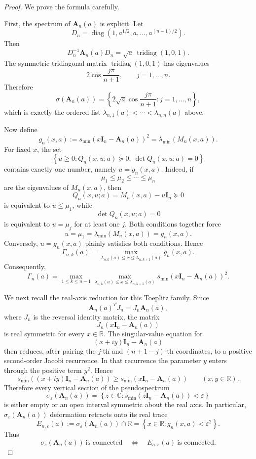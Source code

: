 \documentclass[11pt]{article}
\DeclareMathOperator{\tridiag}{tridiag}
\DeclareMathOperator{\diag}{diag}
\newcommand{\A}{\mathbf A}
\newcommand{\I}{\mathbf I}
\newcommand{\R}{\mathbb R}
\newcommand{\C}{\mathbb C}
\newcommand{\eps}{\varepsilon}
\begin{document}
\begin{proof}
We prove the formula carefully.

First, the spectrum of \(\A_n(a)\) is explicit. Let
\[
D_n=\diag(1,a^{1/2},a,\dots,a^{(n-1)/2}).
\]
Then
\[
D_n^{-1}\A_n(a)D_n
=
\sqrt a\,\tridiag(1,0,1).
\]
The symmetric tridiagonal matrix \(\tridiag(1,0,1)\) has eigenvalues
\[
2\cos\frac{j\pi}{n+1},
\qquad j=1,\dots,n.
\]
Therefore
\[
\sigma(\A_n(a))
=
\left\{
2\sqrt a\cos\frac{j\pi}{n+1}:j=1,\dots,n
\right\},
\]
which is exactly the ordered list \(\lambda_{n,1}(a)<\cdots<\lambda_{n,n}(a)\) above.

Now define
\[
g_n(x,a):=
s_{\min}\!\left(x\I_n-\A_n(a)\right)^2
=
\lambda_{\min}\!\left(M_n(x,a)\right).
\]
For fixed \(x\), the set
\[
\left\{
u\ge0:Q_n(x,u;a)\succeq0,\ \det Q_n(x,u;a)=0
\right\}
\]
contains exactly one number, namely \(u=g_n(x,a)\). Indeed, if
\[
\mu_1\le\mu_2\le\cdots\le\mu_n
\]
are the eigenvalues of \(M_n(x,a)\), then
\[
Q_n(x,u;a)=M_n(x,a)-u\I_n\succeq0
\]
is equivalent to \(u\le\mu_1\), while
\[
\det Q_n(x,u;a)=0
\]
is equivalent to \(u=\mu_j\) for at least one \(j\). Both conditions together force
\[
u=\mu_1=\lambda_{\min}(M_n(x,a))=g_n(x,a).
\]
Conversely, \(u=g_n(x,a)\) plainly satisfies both conditions. Hence
\[
\Gamma_{n,k}(a)
=
\max_{\lambda_{n,k}(a)\le x\le\lambda_{n,k+1}(a)}
g_n(x,a).
\]
Consequently,
\[
\Gamma_n(a)
=
\max_{1\le k\le n-1}
\max_{\lambda_{n,k}(a)\le x\le\lambda_{n,k+1}(a)}
s_{\min}\!\left(x\I_n-\A_n(a)\right)^2.
\]

We next recall the real-axis reduction for this Toeplitz family. Since
\[
\A_n(a)^TJ_n=J_n\A_n(a),
\]
where \(J_n\) is the reversal identity matrix, the matrix
\[
J_n(x\I_n-\A_n(a))
\]
is real symmetric for every \(x\in\R\). The singular-value equation for
\[
(x+iy)\I_n-\A_n(a)
\]
then reduces, after pairing the \(j\)-th and \((n+1-j)\)-th coordinates, to a positive second-order Jacobi recurrence. In that recurrence the parameter \(y\) enters through the positive term \(y^2\). Hence
\[
s_{\min}\!\left((x+iy)\I_n-\A_n(a)\right)
\ge
s_{\min}\!\left(x\I_n-\A_n(a)\right)
\qquad (x,y\in\R).
\]
Therefore every vertical section of the pseudospectrum
\[
\sigma_\eps(\A_n(a))
=
\left\{
z\in\C:
s_{\min}(z\I_n-\A_n(a))<\eps
\right\}
\]
is either empty or an open interval symmetric about the real axis. In particular, \(\sigma_\eps(\A_n(a))\) deformation retracts onto its real trace
\[
E_{n,\eps}(a)
:=
\sigma_\eps(\A_n(a))\cap\R
=
\left\{
x\in\R:g_n(x,a)<\eps^2
\right\}.
\]
Thus
\[
\sigma_\eps(\A_n(a))\ \text{is connected}
\quad\Longleftrightarrow\quad
E_{n,\eps}(a)\ \text{is connected}.
\]


\end{proof}
\end{document}
